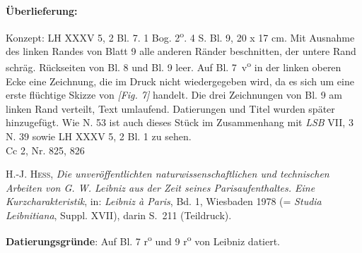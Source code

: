       
               
                \begin{ledgroupsized}[r]{120mm}
                \footnotesize 
                \pstart                
                \noindent\textbf{\"{U}berlieferung:}   
                \pend
                \end{ledgroupsized}
            
              
                            \begin{ledgroupsized}[r]{114mm}
                            \footnotesize 
                            \pstart \parindent -6mm
                            Konzept: LH XXXV 5, 2 Bl. 7. 1 Bog. 2\textsuperscript{o}. 4 S. Bl. 9, 20 x 17 cm. Mit Ausnahme des linken Randes von Blatt 9 alle anderen R\"{a}nder beschnitten, der untere Rand schr\"{a}g. R\"{u}ckseiten von Bl. 8 und Bl. 9 leer. Auf Bl. 7~v\textsuperscript{o} in der linken oberen Ecke eine Zeichnung, die im Druck nicht wiedergegeben wird, da es sich um eine erste fl\"{u}chtige Skizze von \textit{[Fig. 7]} handelt. Die drei Zeichnungen von Bl. 9 am linken Rand verteilt, Text umlaufend. Datierungen und Titel wurden sp\"{a}ter hin\-zugef\"{u}gt. Wie N. 53 ist auch dieses St\"{u}ck im Zusammenhang mit \cite{00261}\textit{LSB} VII, 3 N. 39 sowie LH XXXV 5, 2 Bl. 1 zu sehen.\\Cc 2, Nr. 825, 826
                            \pend
                            \end{ledgroupsized}
              
                            \begin{ledgroupsized}[r]{114mm}
                            \footnotesize 
                            \pstart \parindent -6mm
                            \textsc{H.-J. Hess}, \cite{00188}\textit{Die unver\"{o}ffentlichten naturwissenschaftlichen und technischen Arbeiten von G. W. Leibniz aus der Zeit seines Parisaufenthaltes. Eine Kurzcharakteristik}, in: \textit{Leibniz \`{a} Paris}, Bd. 1, Wiesbaden 1978 (= \textit{Studia Leibnitiana}, Suppl. XVII), darin S.~211 (Teildruck). 
                            \pend
                            \end{ledgroupsized}
                \vspace*{5mm}
                \begin{ledgroup}
                \footnotesize 
                \pstart
            \noindent\footnotesize{\textbf{Datierungsgr\"{u}nde}: Auf Bl. 7 r\textsuperscript{o} und 9 r\textsuperscript{o} von Leibniz datiert.}
                \pend
                \end{ledgroup}
            
